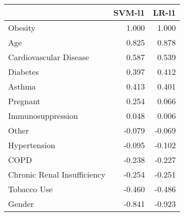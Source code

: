 \begin{tabular}{lrr}
\toprule
{} &  SVM-l1 &  LR-l1 \\
\midrule
Obesity                     &   1.000 &  1.000 \\
Age                         &   0.825 &  0.878 \\
Cardiovascular Disease      &   0.587 &  0.539 \\
Diabetes                    &   0.397 &  0.412 \\
Asthma                      &   0.413 &  0.401 \\
Pregnant                    &   0.254 &  0.066 \\
Immunosuppression           &   0.048 &  0.006 \\
Other                       &  -0.079 & -0.069 \\
Hypertension                &  -0.095 & -0.102 \\
COPD                        &  -0.238 & -0.227 \\
Chronic Renal Insufficiency &  -0.254 & -0.251 \\
Tobacco Use                 &  -0.460 & -0.486 \\
Gender                      &  -0.841 & -0.923 \\
\bottomrule
\end{tabular}
